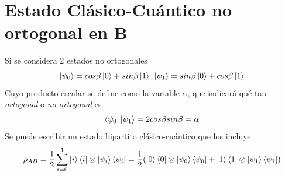 \documentclass{book}
\begin{document}
\section{Estado Clásico-Cuántico no ortogonal en B}
Si se considera 2 estados no ortogonales
\begin{equation}\label{eq2.137} \ket{\psi_0}=cos\beta\ket{0}+sin\beta\ket{1}, \ket{\psi_1}=sin\beta\ket{0}+cos\beta\ket{1}\end{equation}
Cuyo producto escalar se define como la variable $\alpha$, que indicará qué tan \textit{ortogonal} o \textit{no ortogonal} es
\begin{equation}\label{eq2.138}\bra{\psi_0}\ket{\psi_1}=2cos\beta sin \beta=\alpha\end{equation}
Se puede escribir un estado bipartito clásico-cuántico que los incluye:
\begin{equation}\label{eq2.139}\rho_{AB}=\frac{1}{2}\sum_{i=0}^1 \ket{i}\bra{i}\otimes\ket{\psi_i}\bra{\psi_i}=\frac{1}{2}(\ket{0}\bra{0}\otimes\ket{\psi_0}\bra{\psi_0}+\ket{1}\bra{1}\otimes\ket{\psi_1}\bra{\psi_1})\end{equation}
\end{document}
